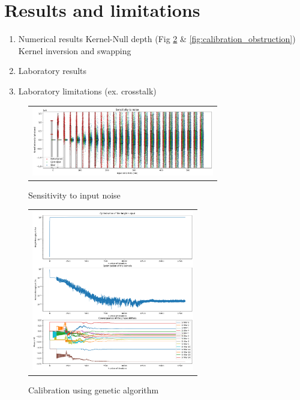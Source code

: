 \documentclass{aa}
\begin{document}

\section{Results and limitations}

    \begin{enumerate}
        \item Numerical results
        \subitem Kernel-Null depth (Fig \ref{fig:calibration_genetic} \& \ref{fig:calibration_obstruction})
        \subitem Kernel inversion and swapping 
        \item Laboratory results
        \item Laboratory limitations (ex. crosstalk)
    \end{enumerate}

    \begin{figure}[H]
        \begin{center}
        \begin{tabular}{c}
        \includegraphics[height=3cm]{img/noise_sensitivity.png}
        \end{tabular}
        \end{center}
        \caption[noise_sensitivity] 
        { \label{fig:noise_sensitivity} 
        Sensitivity to input noise}
    \end{figure}

    \begin{figure}[H]
        \begin{center}
        \begin{tabular}{c}
        \includegraphics[height=7cm]{img/calibration_genetic.png}
        \end{tabular}
        \end{center}
        \caption[calibration_genetic] 
        { \label{fig:calibration_genetic} 
        Calibration using genetic algorithm}
    \end{figure}
\end{document}
